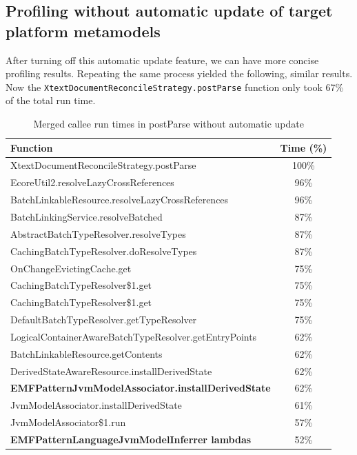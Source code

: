 \documentclass[11pt,a4paper,oneside]{report}
\begin{document}
\subsection{Profiling without automatic update of target platform metamodels}
After turning off this automatic update feature, we can have more concise
profiling results. Repeating the same process yielded the following, similar
results. Now the \texttt{XtextDocumentReconcileStrategy.postParse} function only
took 67\% of the total run time.

\begin{table}[ht]
    \footnotesize
    \centering
    \begin{tabular}{ l c }
        \toprule
        Function & Time (\%) \\
        \midrule
        XtextDocumentReconcileStrategy.postParse & 100\% \\
        EcoreUtil2.resolveLazyCrossReferences & 96\% \\
        BatchLinkableResource.resolveLazyCrossReferences & 96\% \\
        BatchLinkingService.resolveBatched & 87\% \\
        AbstractBatchTypeResolver.resolveTypes & 87\% \\
        CachingBatchTypeResolver.doResolveTypes & 87\% \\
        OnChangeEvictingCache.get & 75\% \\
        CachingBatchTypeResolver\$1.get & 75\% \\
        CachingBatchTypeResolver\$1.get & 75\% \\
        DefaultBatchTypeResolver.getTypeResolver & 75\% \\
        LogicalContainerAwareBatchTypeResolver.getEntryPoints & 62\% \\
        BatchLinkableResource.getContents & 62\% \\
        DerivedStateAwareResource.installDerivedState & 62\% \\
        \textbf{EMFPatternJvmModelAssociator.installDerivedState} & 62\% \\
        JvmModelAssociator.installDerivedState & 61\% \\
        JvmModelAssociator\$1.run & 57\% \\
        \textbf{EMFPatternLanguageJvmModelInferrer lambdas} & 52\% \\
        \bottomrule
    \end{tabular}
    \caption{Merged callee run times in postParse without automatic update}
    \label{tab:postparse-no-auto-update}
\end{table}
\end{document}
